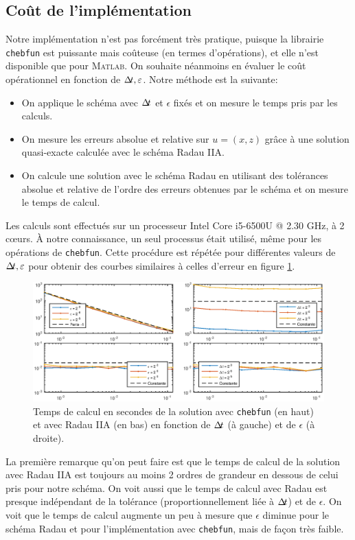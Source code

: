 \subsection{Coût de l'implémentation}

Notre implémentation n'est pas forcément très pratique, puisque la librairie \texttt{chebfun} est puissante mais coûteuse (en termes d'opérations), et elle n'est disponible que pour \textsc{Matlab}. 
On souhaite néanmoins en évaluer le coût opérationnel en fonction de $\Delta\!\!\!\ t,\varepsilon$. Notre méthode est la suivante: 

\begin{itemize} 
\item On applique le schéma avec $\Delta\!\!\!\ t$ et $\epsilon$ fixés et on mesure le temps pris par les calculs. 
\item On mesure les erreurs absolue et relative sur $u = (x,z)$ grâce à une solution quasi-exacte calculée avec le schéma Radau IIA. 
\item On calcule une solution avec le schéma Radau en utilisant des tolérances absolue et relative de l'ordre des erreurs obtenues par le schéma et on mesure le temps de calcul. 
\end{itemize} 
Les calculs sont effectués sur un processeur Intel Core i5-6500U @ 2.30 GHz, à 2 c\oe{}urs. 
À notre connaissance, un seul processus était utilisé, même pour les opérations de \texttt{chebfun}. 
Cette procédure est répétée pour différentes valeurs de $\Delta\!\!\!\ t,\varepsilon$ pour obtenir des courbes similaires à celles d'erreur en figure \ref{fig:cost_cheb_cas1}. 
\begin{figure}[!h]
\centering 
\includegraphics[width=\textwidth]{img/chap3/cheb/cost_cheb_cas1.eps}
\caption{Temps de calcul en secondes de la solution avec \texttt{chebfun} (en haut) et avec Radau IIA (en bas) en fonction de $\Delta\!\!\!\ t$ (à gauche) et de $\epsilon$ (à droite).}
\label{fig:cost_cheb_cas1}
\end{figure}

La première remarque qu'on peut faire est que le temps de calcul de la solution avec Radau IIA est toujours au moins 2 ordres de grandeur en dessous de celui pris pour notre schéma. 
On voit aussi que le temps de calcul avec Radau est presque indépendant de la tolérance (proportionnellement liée à $\Delta\!\!\!\ t$) et de $\epsilon$. 
On voit que le temps de calcul augmente un peu à mesure que $\epsilon$ diminue pour le schéma Radau et pour l'implémentation avec \texttt{chebfun}, mais de façon très faible. 

